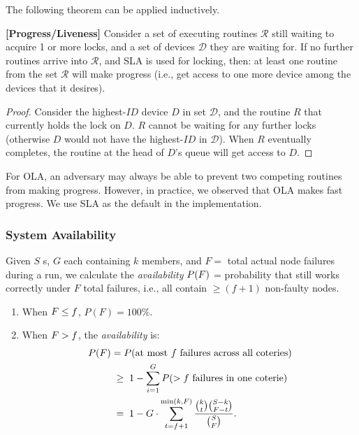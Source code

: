 The following theorem can be applied inductively. 
\begin{theorem}
\label{comesh:theorem:progress} {\bf [Progress/Liveness]} 
Consider a set of executing routines $\mathcal{R}$ 
still waiting to acquire 1 or more locks, and a set of devices $\mathcal{D}$ they are waiting for. If no further routines arrive into $\mathcal{R}$, and SLA is used for locking,  then: at least one routine from the set $\mathcal{R}$ will make progress (i.e., get access to one more device among the devices that it desires).
\end{theorem}
\begin{proof}
Consider the highest-$ID$ device $D$ in set $\mathcal{D}$, and the routine $R$ that currently holds the lock on $D$. $R$ cannot be waiting for any further locks (otherwise $D$ would not have the highest-$ID$ in $\mathcal{D}$). When $R$ eventually completes, the routine at the head of $D$'s queue will get access to $D$.
\end{proof}

For OLA, an adversary may always be able to prevent two competing routines from making progress. However, in practice, we observed that OLA makes fast progress. We use SLA as the default in the \sysname{} implementation.

\subsubsection{System Availability}
Given $S$ \smart{}s, $G$ \kgroups{} each containing $k$ members, {and $F=$ total actual node failures during a run,}  we calculate the {\it availability} $P(F{})$ =  
probability that \sysname{} still works correctly {under $F$ total failures,} i.e., all \kgroups{} contain $\ge (f+1)$ non-faulty nodes.

\begin{enumerate}
    \item When $F{} \le f{}$, $P(F) = 100\%$.
    \item When $F{} > f{}$, the {\it availability} is: 
        \begin{align*}
          P(F) &= P(\text{at most } f \text{ failures across all \kgroups)} \\
               &\;\ge\;1 - \sum_{i=1}^G P(> %
               f \text{ failures in one \kgroup}) \\
               &\;=\;1 - G \cdot \sum_{t=f+1}^{\min(k,F)}\frac{\binom{k}{t}\binom{S-k}{F-t}}{\binom{S}{F}}.
        \end{align*} 
\end{enumerate}



